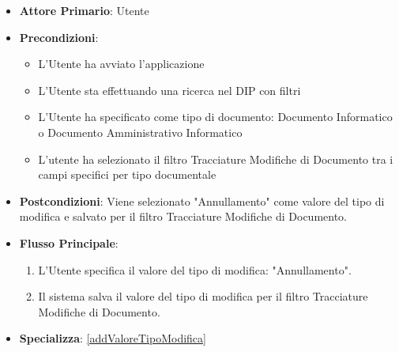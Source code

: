 \begin{itemize}
      \item \textbf{Attore Primario}: Utente
      \item \textbf{Precondizioni}: 
      \begin{itemize}            
            \item L'Utente ha avviato l'applicazione
            \item L'Utente sta effettuando una ricerca nel DIP con filtri
            \item L'Utente ha specificato come tipo di documento: Documento Informatico o Documento Amministrativo Informatico
            \item L'utente ha selezionato il filtro Tracciature Modifiche di Documento tra i campi specifici per tipo documentale
      \end{itemize}
      \item \textbf{Postcondizioni}: Viene selezionato "Annullamento" come valore del tipo di modifica e salvato per il filtro Tracciature Modifiche di Documento.
      \item \textbf{Flusso Principale}:
            \begin{enumerate}
                  \item L'Utente specifica il valore del tipo di modifica: "Annullamento".
                  \item Il sistema salva il valore del tipo di modifica per il filtro Tracciature Modifiche di Documento.
            \end{enumerate}
      \item \textbf{Specializza}: \ref{addValoreTipoModifica}
\end{itemize}

